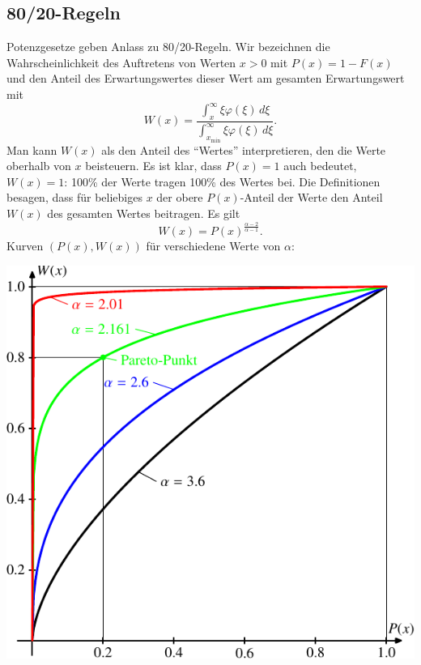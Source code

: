 \subsection{80/20-Regeln}
Potenzgesetze geben Anlass zu 80/20-Regeln.
Wir bezeichnen die Wahrscheinlichkeit des Auftretens von Werten $x>0$ 
mit $P(x)=1-F(x)$ und den Anteil des Erwartungswertes dieser Wert
am gesamten Erwartungswert  mit
\[
W(x)=\frac{\int_x^\infty \xi\varphi(\xi)\,d\xi}{\int_{x_{\text{min}}}^\infty \xi\varphi(\xi)\,d\xi}.
\]
Man kann $W(x)$ als den Anteil des ``Wertes'' interpretieren,
den die Werte oberhalb von $x$ beisteuern.
Es ist klar, dass $P(x)=1$ auch bedeutet, $W(x)=1$: 100\% der Werte
tragen 100\% des Wertes bei.
Die Definitionen besagen, dass für beliebiges $x$ der obere $P(x)$-Anteil
der Werte den Anteil $W(x)$ des gesamten Wertes beitragen.
Es gilt
\[
W(x)= P(x)^{\frac{\alpha-2}{\alpha-1}}.
\]
Kurven $(P(x),W(x))$ für verschiedene Werte von $\alpha$:
\begin{center}
\includegraphics{images/power-4.pdf}
\end{center}

